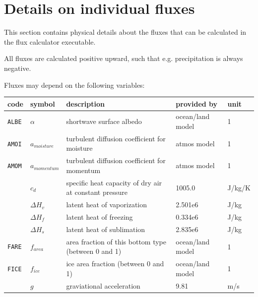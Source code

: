 \documentclass[a4paper,titlepage]{scrartcl}
\begin{document}
\appendix
\newpage
\section{Details on individual fluxes}
This section contains physical details about the fluxes that can be calculated in the flux calculator executable.

All fluxes are calculated positive upward, such that e.g. precipitation is always negative.

Fluxes may depend on the following variables:

\small
\begin{tabular}{lllll}
  \hline \hline
  code & symbol & description & provided by & unit\\
  \hline
	\texttt{ALBE} & $\alpha$       & shortwave surface albedo                                              & ocean/land model & 1       \\
  \texttt{AMOI} & $a_{moisture}$ & turbulent diffusion coefficient for moisture                & atmos model      & 1       \\
  \texttt{AMOM} & $a_{momentum}$ & turbulent diffusion coefficient for momentum                & atmos model      & 1       \\
	              & $c_d$          & specific heat capacity of dry air at constant pressure      & 1005.0           & J/kg/K  \\
                & $\Delta H_v$   & latent heat of vaporization                                 & 2.501e6          & J/kg    \\
                & $\Delta H_f$   & latent heat of freezing                                     & 0.334e6          & J/kg    \\
                & $\Delta H_s$   & latent heat of sublimation                                  & 2.835e6          & J/kg    \\
	\texttt{FARE} & $f_{area}$     & area fraction of this bottom type (between 0 and 1)         & ocean/land model & 1       \\
	\texttt{FICE} & $f_{ice}$      & ice area fraction (between 0 and 1)                         & ocean/land model & 1       \\
                & $g$            & graviational acceleration                                   & 9.81             & m/s     \\

\end{tabular}
\end{document}
